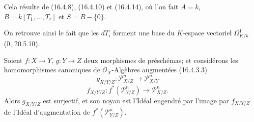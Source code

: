 Cela résulte de (16.4.8), (16.4.10) et (16.4.14), où l'on fait $A=k$,
$B=k[T_1,\ldots,T_r]$ et $S=B-\{0\}$.

On retrouve ainsi le fait que les $dT_i$ forment une base du $K$-espace
vectoriel $\Omega_{K/k}^1$ (0, 20.5.10).

\begin{proposition}[16.4.18]
\label{IV.16.4.18}
Soient $f:X\to Y$, $g:Y\to Z$ deux morphismes de préschémas; et considérons
les homomorphismes canoniques de $\mathcal{O}_X$-Algèbres augmentées
(16.4.3.3)
\[
  g_{X/Y/Z}:\mathscr{P}_{X/Z}^n\longrightarrow\mathscr{P}_{X/Y}^n
  \tag{16.4.18.1}
  \label{IV.16.4.18.1}
\]
\[
  f_{X/Y/Z}:f^*(\mathscr{P}_{Y/Z}^n)
  \longrightarrow\mathscr{P}_{X/Z}^n.
  \tag{16.4.18.2}
  \label{IV.16.4.18.2}
\]
Alors $g_{X/Y/Z}$ est surjectif, et son noyau est l'Idéal engendré par l'image
par $f_{X/Y/Z}$ de l'Idéal d'augmentation de
$f^*(\mathscr{P}_{Y/Z}^n)$.
\end{proposition}

